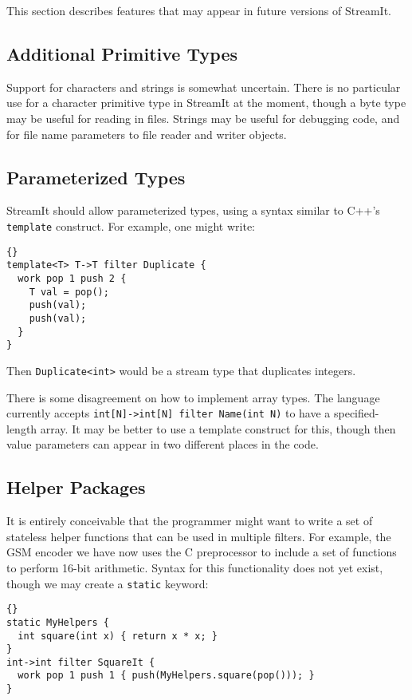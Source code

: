 \documentclass[11pt]{article}
\begin{document}
This section describes features that may appear in future versions of
StreamIt.

\subsection{Additional Primitive Types}

Support for characters and strings is somewhat uncertain.  There is no
particular use for a character primitive type in StreamIt at the
moment, though a byte type may be useful for reading in files.
Strings may be useful for debugging code, and for file name parameters
to file reader and writer objects.

\subsection{Parameterized Types}

StreamIt should allow parameterized types, using a syntax similar to
C++'s \lstinline|template| construct.  For example, one might write:

\begin{lstlisting}{}
template<T> T->T filter Duplicate {
  work pop 1 push 2 {
    T val = pop();
    push(val);
    push(val);
  }
}
\end{lstlisting}

Then \lstinline|Duplicate<int>| would be a stream type that duplicates
integers.

There is some disagreement on how to implement array types.  The
language currently accepts \lstinline|int[N]->int[N] filter Name(int N)| to
have a specified-length array.  It may be better to use a template
construct for this, though then value parameters can appear in two
different places in the code.

\subsection{Helper Packages}

It is entirely conceivable that the programmer might want to write a
set of stateless helper functions that can be used in multiple
filters.  For example, the GSM encoder we have now uses the C
preprocessor to include a set of functions to perform 16-bit
arithmetic.  Syntax for this functionality does not yet exist, though
we may create a \lstinline|static| keyword:

\begin{lstlisting}{}
static MyHelpers {
  int square(int x) { return x * x; }
}
int->int filter SquareIt {
  work pop 1 push 1 { push(MyHelpers.square(pop())); }
}
\end{lstlisting}
\end{document}
